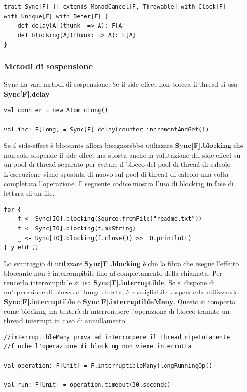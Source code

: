\begin{verbatim}
trait Sync[F[_]] extends MonadCancel[F, Throwable] with Clock[F] 
with Unique[F] with Defer[F] {
    def delay[A](thunk: => A): F[A]
    def blocking[A](thunk: => A): F[A]
}   
\end{verbatim}
\subsubsection{Metodi di sospensione}
Sync ha vari metodi di sospensione. Se il side effect non blocca il thread si usa \textbf{Sync[F].delay}
\begin{verbatim}
val counter = new AtomicLong()

val inc: F[Long] = Sync[F].delay(counter.incrementAndGet())
\end{verbatim}
\noindent Se il side-effect è bloccante allora bisognerebbe utilizzare \textbf{Sync[F].blocking} che non solo sospende il side-effect ma sposta anche la valutazione del side-effect su un pool di thread separato per evitare il blocco del pool di thread di calcolo. L’esecuzione viene spostata di nuovo sul pool di thread di calcolo una volta completata l’operazione. Il seguente codice mostra l'uso di blocking in fase di lettura di un file.
\begin{verbatim}
for {
    f <- Sync[IO].blocking(Source.fromFile("readme.txt"))
    t <- Sync[IO].blocking(f.mkString)
    _ <- Sync[IO].blocking(f.close()) >> IO.println(t)
} yield ()

\end{verbatim}

Lo svantaggio di utilizzare \textbf{Sync[F].blocking} è che la fibra che esegue l’effetto bloccante non è interrompibile fino al completamento della chiamata. Per renderlo
interrompibile si usa \textbf{Sync[F].interruptible}. Se si dispone di un'operazione di blocco di lunga durata, è consigliabile sospenderla utilizzando \textbf{Sync[F].interruptible} o \textbf{Sync[F].interruptibleMany}. Questo si comporta come blocking ma tenterà di interrompere l'operazione di blocco tramite un thread interrupt in caso di annullamento.

\begin{verbatim}
//interruptibleMany prova ad interrompere il thread ripetutamente
//finche l'operazione di blocking non viene interrotta

val operation: F[Unit] = F.interruptibleMany(longRunningOp())

val run: F[Unit] = operation.timeout(30.seconds)
    
\end{verbatim}

